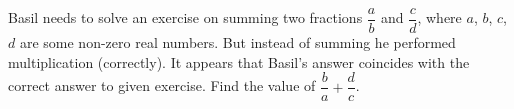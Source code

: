Basil needs to solve an exercise on summing two fractions $\dfrac{a}{b}$ and $\dfrac{c}{d}$, where  $a$, $b$, $c$, $d$ are some non-zero real numbers. But instead of summing he performed multiplication  (correctly). It appears that Basil's answer coincides with the correct answer to given exercise. Find the value of  $\dfrac{b}{a} + \dfrac{d}{c}$.